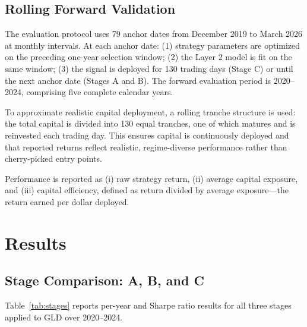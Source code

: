 \documentclass[11pt, letterpaper]{article}
\begin{document}
\subsection{Rolling Forward Validation}

The evaluation protocol uses 79 anchor dates from December 2019 to March 2026
at monthly intervals. At each anchor date: (1) strategy parameters are
optimized on the preceding one-year selection window; (2) the Layer 2 model
is fit on the same window; (3) the signal is deployed for 130 trading days
(Stage C) or until the next anchor date (Stages A and B). The forward
evaluation period is 2020--2024, comprising five complete calendar years.

To approximate realistic capital deployment, a rolling tranche structure is
used: the total capital is divided into 130 equal tranches, one of which
matures and is reinvested each trading day. This ensures capital is
continuously deployed and that reported returns reflect realistic,
regime-diverse performance rather than cherry-picked entry points.

Performance is reported as (i) raw strategy return, (ii) average capital
exposure, and (iii) capital efficiency, defined as return divided by average
exposure---the return earned per dollar deployed.

\section{Results}

\subsection{Stage Comparison: A, B, and C}

Table~\ref{tab:stages} reports per-year and Sharpe ratio results for all
three stages applied to GLD over 2020--2024.
\end{document}
